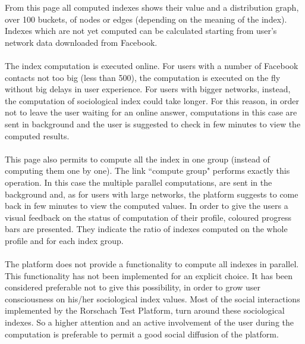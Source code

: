 From this page all computed indexes shows their value and a distribution graph, over 100 buckets, of nodes or edges (depending on the meaning of the index).
Indexes which are not yet computed can be calculated starting from user's network data downloaded from Facebook.\\
\\
The index computation is executed online.
For users with a number of Facebook contacts not too big (less than 500), the computation is executed on the ﬂy without big delays in user experience.
For users with bigger networks, instead, the computation of sociological index could take longer.
For this reason, in order not to leave the user waiting for an online answer, computations in this case are sent in background and the user is suggested to check
in few minutes to view the computed results.\\
\\
This page also permits to compute all the index in one group (instead of computing them one by one).
The link ``compute group" performs exactly this operation.
In this case the multiple parallel computations, are sent in the background and, as for users with large networks, the platform suggests to come back in few minutes
to view the computed values.
In order to give the users a visual feedback on the status of computation of their profile, coloured progress bars are presented.
They indicate the ratio of indexes computed on the whole profile and for each index group.\\
\\
The platform does not provide a functionality to compute all indexes in parallel.
This functionality has not been implemented for an explicit choice.
It has been considered preferable not to give this possibility, in order to grow user consciousness on his/her sociological index values.
Most of the social interactions implemented by the Rorschach Test Platform, turn around these sociological indexes.
So a higher attention and an active involvement of the user during the computation is preferable to permit a good social diffusion of the platform.

\label{sec:graphvisualization}
